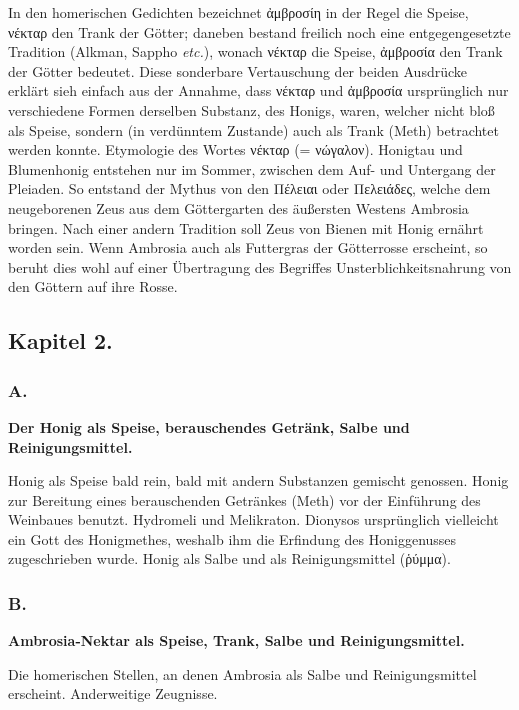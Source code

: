 \documentclass[a4paper, 11pt, oneside]{article}
\begin{document}
In den homerischen Gedichten bezeichnet ἀμβροσίη in der Regel die Speise, νέκταρ den Trank der Götter; daneben bestand freilich noch eine entgegengesetzte Tradition (Alkman, Sappho \emph{etc.}), wonach νέκταρ die Speise, ἀμβροσία den Trank der Götter bedeutet. Diese sonderbare Vertauschung der beiden Ausdrücke erklärt sieh einfach aus der Annahme, dass νέκταρ und ἀμβροσία ursprünglich nur verschiedene Formen derselben Substanz, des Honigs, waren, welcher nicht bloß als Speise, sondern (in verdünntem Zustande) auch als Trank (Meth) betrachtet werden konnte. Etymologie des Wortes νέκταρ (= νώγαλον). Honigtau und Blumenhonig entstehen nur im Sommer, zwischen dem Auf- und Untergang der Pleiaden. So entstand der Mythus von den Πέλειαι oder Πελειάδες, welche dem neugeborenen Zeus aus dem Göttergarten des äußersten Westens Ambrosia bringen. Nach einer andern Tradition soll Zeus von Bienen mit Honig ernährt worden sein. Wenn Ambrosia auch als Futtergras der Götterrosse erscheint, so beruht dies wohl auf einer Übertragung des Begriffes Unsterblichkeitsnahrung von den Göttern auf ihre Rosse.

\subsection*{Kapitel 2.}

\subsubsection*{A.}

\textbf{Der Honig als Speise, berauschendes Getränk, Salbe und Reinigungsmittel.}

Honig als Speise bald rein, bald mit andern Substanzen gemischt genossen. Honig zur Bereitung eines berauschenden Getränkes (Meth) vor der Einführung des Weinbaues benutzt. Hydromeli und Melikraton. Dionysos ursprünglich vielleicht ein Gott des Honigmethes, weshalb ihm die Erfindung des Honiggenusses zugeschrieben wurde. Honig als Salbe und als Reinigungsmittel (ῥύμμα).

\subsubsection*{B.}

\textbf{Ambrosia-Nektar als Speise, Trank, Salbe und Reinigungsmittel.}

Die homerischen Stellen, an denen Ambrosia als Salbe und Reinigungsmittel erscheint. Anderweitige Zeugnisse.
\end{document}

